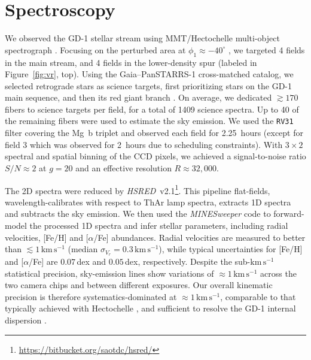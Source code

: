 \documentclass[twocolumn]{aastex63}
\newcommand{\package}[1]{\textsl{#1}}
\newcommand{\kms}{\ensuremath{\textrm{km}\,\textrm{s}^{-1}}}
\begin{document}
\section{Spectroscopy}
\label{sec:spec}


We observed the GD-1 stellar stream using MMT/Hectochelle multi-object spectrograph \citep{szentgyorgyi2011}.
Focusing on the perturbed area at $\phi_1\approx-40^\circ$ \citep[$\phi_{1,2}$ are coordinates oriented along and perpendicular to GD-1, respectively;][]{koposov2010}, we targeted 4 fields in the main stream, and 4 fields in the lower-density spur (labeled in Figure~\ref{fig:vr}, top).
Using the Gaia--PanSTARRS-1 cross-matched catalog, we selected retrograde stars as science targets, first prioritizing stars on the GD-1 main sequence, and then its red giant branch \citep[see][]{pwb}.
On average, we dedicated $\gtrsim170$ fibers to science targets per field, for a total of 1409 science spectra.
Up to 40 of the remaining fibers were used to estimate the sky emission.
We used the \texttt{RV31} filter covering the Mg~b triplet and observed each field for 2.25~hours (except for field 3 which was observed for 2~hours due to scheduling constraints).
With $3\times2$ spectral and spatial binning of the CCD pixels, we achieved a signal-to-noise ratio $S/N\approx2$ at $g=20$ and an effective resolution $R\approx32,000$.

The 2D spectra were reduced by \package{HSRED}~v2.1\footnote{\url{https://bitbucket.org/saotdc/hsred/}}.
This pipeline flat-fields, wavelength-calibrates with respect to ThAr lamp spectra, extracts 1D spectra and subtracts the sky emission.
We then used the \package{MINESweeper} code \citep{cargile2019} to forward-model the processed 1D spectra and infer stellar parameters, including radial velocities, [Fe/H] and [$\alpha$/Fe] abundances.
Radial velocities are measured to better than $\lesssim1\,\kms$ (median $\sigma_{V_r}=0.3\,\kms$), while typical uncertainties for [Fe/H] and [$\alpha$/Fe] are $0.07$\,dex and $0.05$\,dex, respectively.
Despite the sub-$\kms$ statistical precision, sky-emission lines show variations of $\approx1\,\kms$ across the two camera chips and between different exposures.
Our overall kinematic precision is therefore systematics-dominated at $\approx1\,\kms$, comparable to that typically achieved with Hectochelle \citep[e.g.,][]{caldwell2017}, and sufficient to resolve the GD-1 internal dispersion \citep{malhan2019}.
\end{document}
